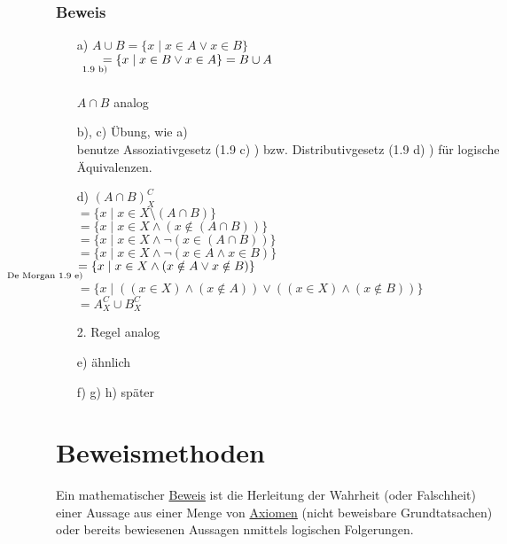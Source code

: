 \documentclass[a4paper, 12pt, twoside] {article}
\begin{document}
\subsubsection*{Beweis}

\begin{itemize}
	\item[a)]
		$A \cup B = \{x \mid x \in A \lor x \in B\}$ \\
		$\qquad \underset{\mathllap{\text{1.9 b)}}}{=} \{x \mid x \in B \lor x \in A\} = B \cup A$ \\
		\hfill \\		
		$A \cap B$ analog
		
	\item[b), c)]
		Übung, wie a) \\
		benutze Assoziativgesetz (1.9 c) ) bzw. Distributivgesetz (1.9 d) ) für logische Äquivalenzen.
		
	\item[d)]
		$(A \cap B)^C_X$ \\
		$ = \{x \mid x \in X \setminus (A \cap B) \}$ \\
		$ = \{x \mid x \in X \land (x \notin (A \cap B)) \}$ \\
		$ = \{x \mid x \in X \land \neg (x \in (A \cap B)) \}$ \\
		$ = \{x \mid x \in X \land \neg (x \in A \land x \in B) \}$ \\
		$ \underset{\mathllap{\text{De Morgan 1.9 e)}}}{=} \{x \mid x \in X \land (x \notin A \lor x \notin B)\}$ \\
		$ = \{x \mid ((x \in X) \land (x \notin A)) \lor ((x \in X) \land (x \notin B)) \}$ \\
		$ = A^C_X \cup B^C_X$
		
		2. Regel analog
		
	\item[e)]
		ähnlich
	\item[f) g) h)]
		später
\end{itemize}

\section{Beweismethoden} %

Ein mathematischer \underline{Beweis} ist die Herleitung der Wahrheit (oder Falschheit) einer Aussage aus einer Menge von \underline{Axiomen} (nicht beweisbare Grundtatsachen) oder bereits bewiesenen Aussagen nmittels logischen Folgerungen.
\end{document}
